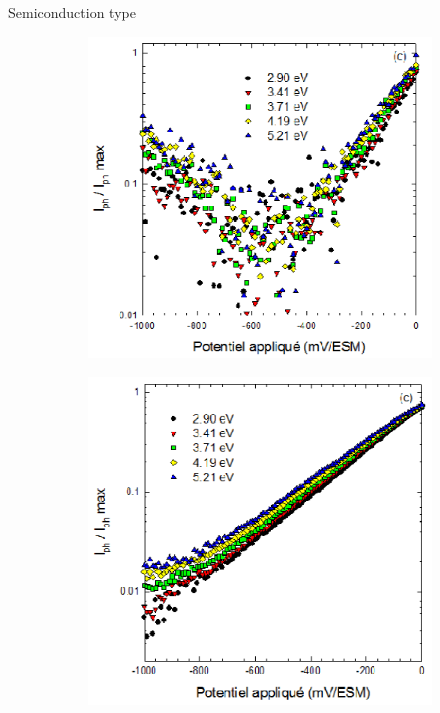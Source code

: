 \documentclass[10pt,compress]{beamer}
\newcommand{\coef}{1}
\begin{document}
\begin{frame}[allowframebreaks=1.0]{Semiconduction type}
        \renewcommand{\coef}{0.45}
        \begin{figure}[h]
            \centering
            \begin{subfigure}{\coef\textwidth}
                \centering
                \includegraphics[width=\textwidth]{./src/figures/Loucif2012-Fig3-18.png}
                \caption{}
                \label{fig_loucif_sctype_a}
            \end{subfigure}
            \begin{subfigure}{\coef\textwidth}
                \centering
                \includegraphics[width=\textwidth]{./src/figures/Loucif2012-Fig3-19.png}
                \caption{}
                \label{fig_loucif_sctype_b}
            \end{subfigure}
            

\end{figure}
\end{frame}
\end{document}
